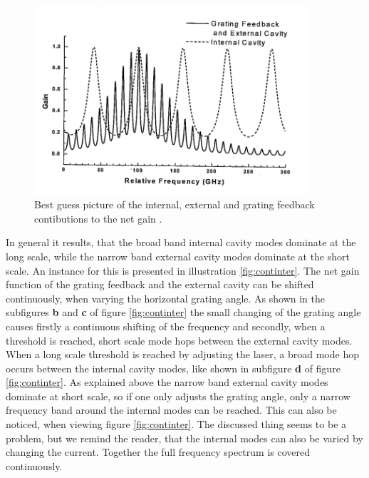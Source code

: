 \begin{figure}
  \centering
  \includegraphics[height=7cm]{Ordnername/bestguess.png}
  \caption{Best guess picture of the internal, external and grating feedback contibutions to the net gain \cite{manual}.}
  \label{fig:bestguess}
\end{figure}

In general it results, that the broad band internal cavity modes dominate at the long scale, while the narrow band external cavity modes
dominate at the short scale. An instance for this is presented in illustration \ref{fig:continter}.
The net gain function of the grating feedback and the external cavity can be shifted continuously, when varying the
horizontal grating angle. As shown in the subfigures \textbf{b} and \textbf{c} of figure \ref{fig:continter} the small changing
of the grating angle causes firstly a continuous shifting of the frequency and secondly, when a threshold is reached, short scale
mode hops between the external cavity modes. When a long scale threshold is reached by adjusting the laser, a broad mode hop occurs
between the internal cavity modes, like shown in subfigure \textbf{d} of figure \ref{fig:continter}.
As explained above the narrow band external cavity modes dominate at short scale, so if one only adjusts the grating angle, only
a narrow frequency band around the internal modes can be reached. This can also be noticed, when viewing figure \ref{fig:continter}.
The discussed thing seems to be a problem, but we remind the reader, that the internal modes can also be varied by changing the current.
Together the full frequency spectrum is covered continuously.

